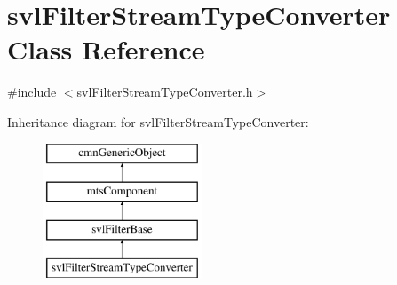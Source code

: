 \hypertarget{classsvl_filter_stream_type_converter}{\section{svl\-Filter\-Stream\-Type\-Converter Class Reference}
\label{classsvl_filter_stream_type_converter}
}


{\ttfamily \#include $<$svl\-Filter\-Stream\-Type\-Converter.\-h$>$}

Inheritance diagram for svl\-Filter\-Stream\-Type\-Converter\-:\begin{figure}[H]
\begin{center}
\leavevmode
\includegraphics[height=4.000000cm]{da/d8d/classsvl_filter_stream_type_converter}
\end{center}
\end{figure}
